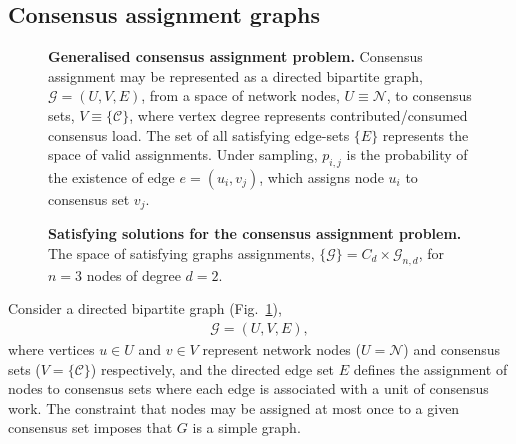 \subsection{Consensus assignment graphs} \label{sec:assign_graphs}

\begin{figure}[!htb]
	\centering
	
	\caption{\textbf{Generalised consensus assignment problem.} Consensus assignment may be represented as a directed bipartite graph, \mbox{$\mathcal{G}=(U,V,E)$}, from a space of network nodes, $U\equiv\mathcal{N}$, to consensus sets, $V\equiv\{\mathcal{C}\}$, where vertex degree represents contributed/consumed consensus load. The set of all satisfying edge-sets $\{E\}$ represents the space of valid assignments. Under sampling, $p_{i,j}$ is the probability of the existence of edge \mbox{$e=(u_i,v_j)$}, which assigns node $u_i$ to consensus set $v_j$.}\label{fig:bipartite_map}
\end{figure}

\begin{figure}[!htb]
	\centering
	\resizebox{0.3\columnwidth}{!}{}
	\hfill
	\resizebox{0.3\columnwidth}{!}{}
	\hfill
	\resizebox{0.3\columnwidth}{!}{}
	
	\vspace{10pt}
	
	\resizebox{0.3\columnwidth}{!}{}
	\hfill
	\resizebox{0.3\columnwidth}{!}{}
	\hfill
	\resizebox{0.3\columnwidth}{!}{}
	\caption{\textbf{Satisfying solutions for the consensus assignment problem.} The space of satisfying graphs assignments, \mbox{$\{\mathcal{G}\} = C_d\times \mathcal{G}_{n,d}$}, for $n=3$ nodes of degree $d=2$.} \label{fig:edge_assignments}
\end{figure}

Consider a directed bipartite graph (Fig.~\ref{fig:bipartite_map}),
\begin{align}
	\mathcal{G} = (U,V,E),
\end{align}
where vertices $u\in U$ and $v\in V$ represent network nodes (\mbox{$U=\mathcal{N}$}) and consensus sets (\mbox{$V=\mathcal{\{\mathcal{C}\}}$}) respectively, and the directed edge set $E$ defines the assignment of nodes to consensus sets where each edge is associated with a unit of consensus work. The constraint that nodes may be assigned at most once to a given consensus set imposes that $G$ is a simple graph.

